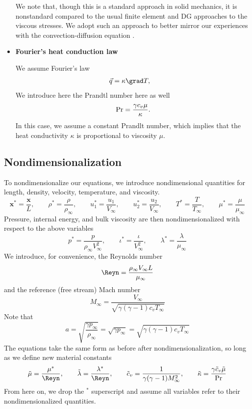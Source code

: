\begin{itemize}
We note that, though this is a standard approach in solid mechanics, it is nonstandard compared to the usual finite element and DG approaches to the viscous stresses. We adopt such an approach to better mirror our experiences with the convection-diffusion equation \cite{DPGrobustness,DPGrobustness2}. 


\item \textbf{Fourier's heat conduction law}

We assume Fourier's law 
\begin{align*}
\vec{q} &= \kappa \grad T,
\end{align*}
We introduce here the Prandtl number here as well
\[
{\rm Pr} = \frac{\gamma c_v \mu}{\kappa}.
\]
In this case, we assume a constant Prandlt number, which implies that the heat conductivity $\kappa$ is proportional to viscosity $\mu$.

\end{itemize}

\subsection{Nondimensionalization}
To nondimensionalize our equations, we introduce nondimensional quantities for length, density, velocity, temperature, and viscosity. 
\[
\boldsymbol x^* = \frac{\boldsymbol x}{L}, \qquad \rho^* = \frac{\rho}{\rho_{\infty}}, \qquad u_1^* = \frac{u_1}{V_\infty}, \qquad u_2^* = \frac{u_2}{V_\infty}, \qquad T^* = \frac{T}{T_\infty}, \qquad \mu^* = \frac{\mu}{\mu_\infty}
\]
Pressure, internal energy, and bulk viscosity are then nondimensionalized with respect to the above variables
\[
p^* = \frac{p}{\rho_\infty V_\infty^2}, \qquad \iota^* = \frac{\iota}{V_\infty^2}, \qquad \lambda^* = \frac{\lambda}{\mu_\infty}
\]
We introduce, for convenience, the Reynolds number
\[
\Reyn = \frac{\rho_\infty V_\infty L}{\mu_\infty} 
\]
and the reference (free stream) Mach number
\[
M_\infty = \frac{V_\infty}{\sqrt{\gamma(\gamma-1)c_vT_\infty}}
\]
Note that 
\[
a = \sqrt{\frac{\gamma p_\infty}{\rho_\infty}} = \sqrt{{\gamma p_\infty}} = \sqrt{\gamma(\gamma-1)c_vT_\infty}
\]
The equations take the same form as before after nondimensionalization, so long as we define new material constants
\[
\tilde{\mu} = \frac{\mu^*}{\Reyn}, \qquad \tilde{\lambda} = \frac{\lambda^*}{\Reyn}, \qquad \tilde{c}_v = \frac{1}{\gamma(\gamma-1)M_\infty^2}, \qquad \tilde{\kappa} = \frac{\gamma\tilde{c}_v\tilde{\mu}}{\rm Pr}
\]
From here on, we drop the $^*$ superscript and assume all variables refer to their nondimensionalized quantities.

